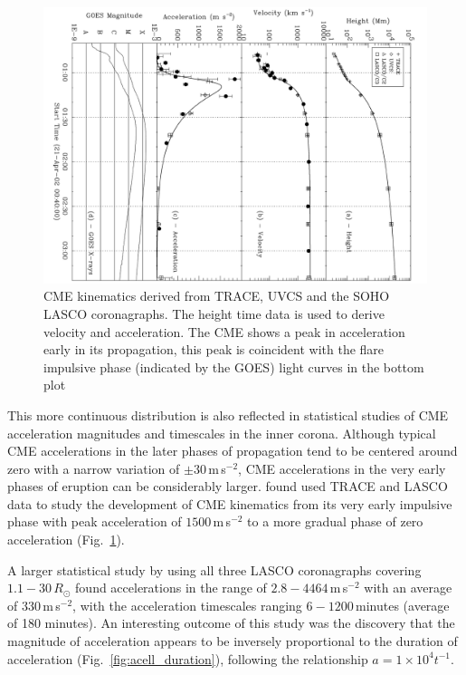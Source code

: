 \begin{figure}[t!]
\begin{center}
\includegraphics[scale=0.35, angle=90, trim=1cm 0cm 2cm 2cm]{images/gall_kins2003}
\caption[CME height, speed, and acceleration as function of time]{CME kinematics derived from TRACE, UVCS and the SOHO LASCO coronagraphs. The height time data is used to derive velocity and acceleration. The CME shows a peak in acceleration early in its propagation, this peak is coincident with the flare impulsive phase (indicated by the GOES) light curves in the bottom plot \citet{gallagher03}}
\label{fig:gall2003}
\end{center}
\end{figure}
This more continuous distribution is also reflected in statistical studies of CME acceleration magnitudes and timescales in the inner corona. Although typical CME accelerations in the later phases of propagation tend to be centered around zero with a narrow variation of $\pm30$\,m\,s$^{-2}$, CME accelerations in the very early phases of eruption can be considerably larger. \citet{gallagher03} found used TRACE and LASCO data to study the development of CME kinematics from its very early impulsive phase with peak acceleration of $1500$\,m\,s$^{-2}$ to a more gradual phase of zero acceleration (Fig.~\ref{fig:gall2003}). 

A larger statistical study by \citep{zhang2006} using all three LASCO coronagraphs covering $1.1-30\,R_{\odot}$ found accelerations in the range of $2.8-4464$\,m\,s$^{-2}$ with an average of 330\,m\,s$^{-2}$, with the acceleration timescales ranging $6-1200$\,minutes (average of 180 minutes). An interesting outcome of this study was the discovery that the magnitude of acceleration appears to be inversely proportional to the duration of acceleration (Fig.~\ref{fig:acell_duration}), following the relationship $a=1\times10^4t^{-1}$.

